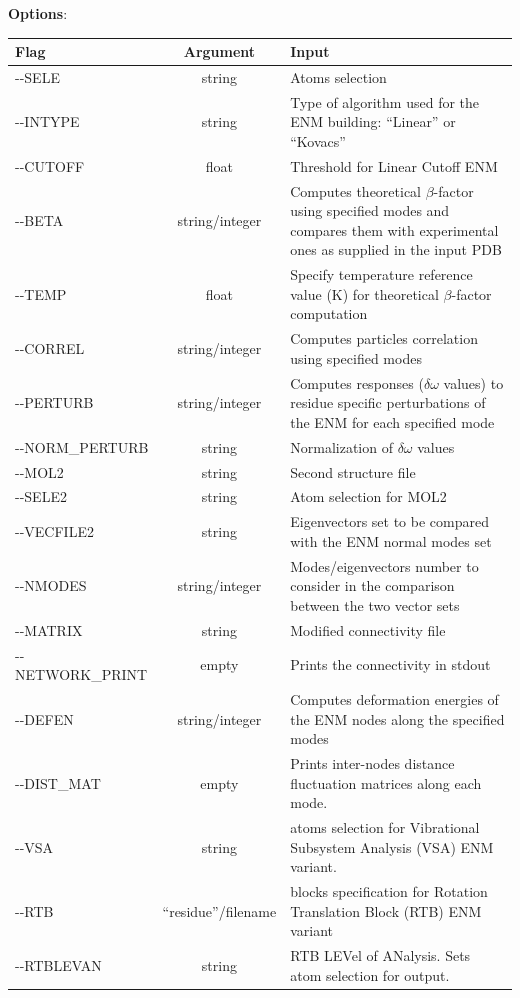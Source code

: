 \documentclass[11pt,twoside,onecolumn,a4paper,openright,notitlepage]{book}[2001/04/21]
\begin{document}
\textbf{\large Options}:\\
\begin{longtable}{l|c|p{7.0cm}}
Flag & Argument & Input \\
\hline
-{}-SELE          & string         & Atoms selection \\
-{}-INTYPE        & string         & Type of algorithm used for the ENM building: ``Linear'' or ``Kovacs''\\
-{}-CUTOFF        & float          & Threshold for Linear Cutoff ENM\\
-{}-BETA          & string/integer & Computes theoretical $\beta{}$-factor using specified modes and compares them with experimental ones as supplied in the input PDB \\
-{}-TEMP          & float          & Specify temperature reference value (K) for theoretical $\beta{}$-factor computation  \\
-{}-CORREL	      & string/integer & Computes particles correlation using specified modes \\
-{}-PERTURB	      & string/integer & Computes responses ($\delta{}\omega{}$ values)  \cite{Zheng:2005b} to residue specific perturbations of the ENM for each specified mode\\
-{}-NORM\_PERTURB & string         & Normalization of $\delta{}\omega{}$ values\\
-{}-MOL2	        & string         & Second structure file \\
-{}-SELE2         & string         & Atom selection for MOL2\\
-{}-VECFILE2	    & string         & Eigenvectors set to be compared with the ENM normal modes set\\
-{}-NMODES        & string/integer & Modes/eigenvectors number to consider in the comparison between the two vector sets\\ 
-{}-MATRIX        & string         & Modified connectivity file\\
-{}-NETWORK\_PRINT &empty           & Prints the connectivity in stdout\\
-{}-DEFEN         &string/integer  &Computes deformation energies of the ENM nodes along the specified modes \cite{Wang:2004}\\
-{}-DIST\_MAT     &empty           &Prints inter-nodes distance fluctuation matrices along each mode.\\
-{}-VSA           &string          &atoms selection for Vibrational Subsystem Analysis (VSA) ENM variant.\\
-{}-RTB           &``residue''/filename &blocks specification for Rotation Translation Block (RTB) ENM variant\\
-{}-RTBLEVAN      &string          &RTB LEVel of ANalysis. Sets atom selection for output.

\end{longtable}
\end{document}
